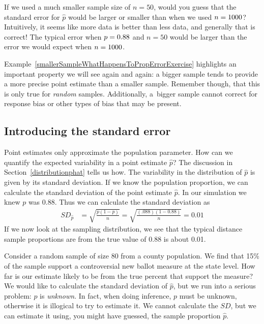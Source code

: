 \begin{examplewrap}
\begin{nexample}{If we used a much smaller sample size of $n = 50$,
would you guess that the standard error for $\hat{p}$ would be larger
or smaller than when we used $n = 1000{}$?}
\label{smallerSampleWhatHappensToPropErrorExercise}
Intuitively, it seems like more data is better
than less data, and generally that is correct! The typical error
when $p = 0.88{}$ and $n = 50$ would be larger
than the error we would expect when $n = 1000{}$.
\end{nexample}
\end{examplewrap}

Example~\ref{smallerSampleWhatHappensToPropErrorExercise}
highlights an important property we will see again and again:
a bigger sample tends to provide a more precise point estimate
than a smaller sample.
Remember though, that this is only true for \emph{random} samples.
Additionally, a~bigger sample cannot correct for response bias or other types of bias that may be present.


\subsection{Introducing the standard error}

Point estimates only approximate the population parameter.  How can we quantify the expected variability in a point estimate $\hat{p}$? The discussion in Section~\ref{distributionphat} tells us how. The variability in the distribution of $\hat{p}$ is given by its standard deviation. If we know the population proportion, we can calculate the standard deviation of the point estimate $\hat{p}$.  In our simulation we knew $p$ was 0.88.  Thus we can calculate the standard deviation as 
\begin{align*}
SD_{\hat{p}}&=\sqrt{\frac{p(1-p)}{n}} = \sqrt{\frac{(.088)(1-0.88)}{n}}= 0.01
\end{align*}
If we now look at the sampling distribution, we see that the typical distance sample proportions are from the true value of 0.88 is about 0.01.

\begin{examplewrap}
\begin{nexample}{Consider a random sample of size 80 from a county population.
    We find that 15\% of the sample support a controversial new ballot measure
    at the state level.
    How far is our estimate likely to be from the true percent that support
    the measure?}
We would like to calculate the standard deviation of $\hat{p}$,
but we run into a serious problem: $p$ is \emph{unknown}.
In fact, when doing inference, $p$ must be unknown, otherwise it is illogical
to try to estimate it.
We cannot calculate the $SD$, but we can estimate it using, you might have
guessed, the sample proportion $\hat{p}$.
\end{nexample}
\end{examplewrap}
 
